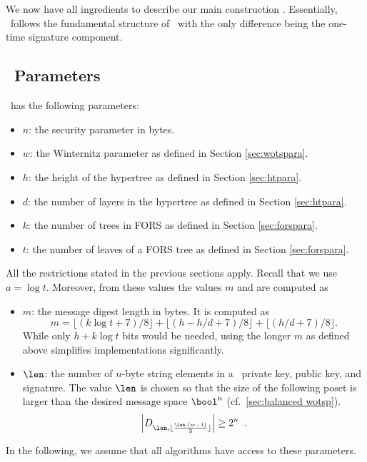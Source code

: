 \section{\SPHINCSA}
\label{sec:spx-core}
We now have all ingredients to describe our main construction \SPHINCSA. Essentially, \SPHINCSA\ follows the fundamental structure of \SPHINCSA\ with the only difference being the one-time signature component.

\subsection{\SPHINCSA\ Parameters}

\SPHINCSA\ has the following parameters:

\begin{itemize}

    \item $n$: the security parameter in bytes.

    \item $w$: the Winternitz parameter as defined in Section \ref{sec:wotspara}.
    
    \item $h$: the height of the hypertree as defined in Section \ref{sec:htpara}.
    
    \item $d$: the number of layers in the hypertree as defined in Section \ref{sec:htpara}.
    
    \item $k$: the number of trees in FORS as defined in Section \ref{sec:forspara}.
    
    \item $t$: the number of leaves of a FORS tree as defined in Section \ref{sec:forspara}.
    
\end{itemize}

All the restrictions stated in the previous sections apply. Recall that we use $a=\log t.$ Moreover, from these values the values $m$ and \len are computed as

\begin{itemize}
    \item $m$: the message digest length in bytes. It is computed as
    $$
    m=\lfloor(k\log t+7)/8\rfloor+\lfloor(h-h/d+7)/8\rfloor+\lfloor(h/d+7)/8\rfloor.
    $$
    While only $h+k\log t$ bits would be needed, using the longer $m$ as defined above simplifies implementations significantly.
    
    \item $\len$: the number of $n$-byte string elements in a \WOTSCS\ private key, public key, and signature. The value $\len$ is chosen so that the size of the following poset is larger than the desired message space $\bool^n$ (cf.~\cref{sec:balanced wotsp}).
    \[\left| D_{ \len, \lfloor \frac{\len \cdot (w-1)}{2} \rfloor } \right| \geq 2^n \enspace. \]

\end{itemize}
In the following, we assume that all algorithms have access to these parameters.

